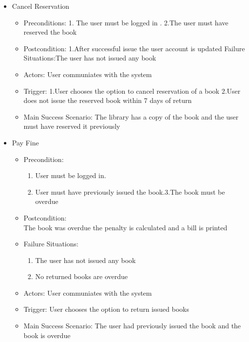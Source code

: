 \documentclass{article}
\begin{document}
\begin{enumerate}
\begin{itemize}
 \item Cancel Reservation
 \begin{itemize}
 \item  Preconditions:
 1. The user must be logged in .
 2.The user must have reserved the book
 \item Postcondition:
 1.After successful issue the user account is updated 
Failure Situations:The user has not issued any book
 \item Actors: User communiates with the system
 \item Trigger: 
 1.User chooses the option to cancel reservation of a book 
 2.User does not issue the reserved book within 7 days of return
 \item Main Success Scenario: The library has a copy of the book and the user must have reserved it previously
	
 \end{itemize}

\item Pay Fine
	\begin{itemize}
	\item  Precondition:
	\begin{enumerate}	
	\item User must be logged in.
	\item User must have previously issued the book.3.The book must be overdue
	\end{enumerate}
 \item Postcondition:\\
  The book was overdue the penalty is calculated and a bill is printed 
 \item Failure Situations:
 \begin{enumerate}
 \item The user has not issued any book
  \item No returned books are overdue
	\end{enumerate} 
 \item Actors: User communiates with the system
 \item Trigger: User chooses the option to return issued books
 \item Main Success Scenario: The user had previously issued the book and the book is overdue
	\end{itemize}
\end{itemize}



\end{enumerate}
\end{document}
